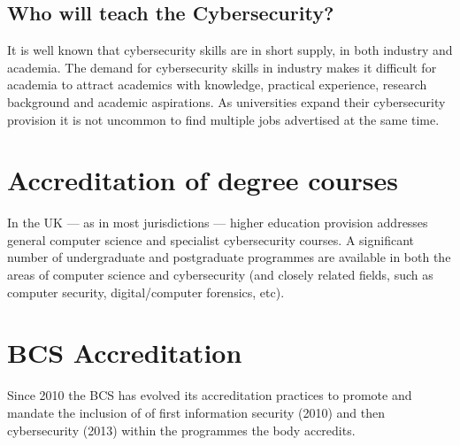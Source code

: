 \documentclass[a4paper,11pt]{article}
\begin{document}
\subsection*{Who will teach the Cybersecurity?}\label{sec:staffing}

It is well known that cybersecurity skills are in short supply, in both industry and academia. The demand for cybersecurity skills in industry makes it difficult for academia to attract academics with knowledge, practical experience, research background and academic aspirations. As universities expand their cybersecurity provision it is not uncommon to find multiple jobs advertised at the same time. 

\section*{Accreditation of degree courses }

In the UK --- as in most jurisdictions --- higher education provision addresses general computer science and specialist cybersecurity courses. A significant number of undergraduate and postgraduate programmes are available in both the areas of computer science and cybersecurity (and closely related fields, such as computer security, digital/computer forensics, etc). 


\section*{BCS Accreditation}

Since 2010 the BCS has evolved its accreditation practices to promote and mandate the inclusion of of first information security (2010) and then cybersecurity (2013) within the programmes the body accredits. 

\end{document}
